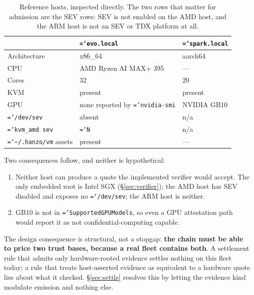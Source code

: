 \documentclass[11pt,a4paper]{article}
\newcommand{\code}[1]{\texttt{\hyphenchar\font=`\-\relax #1}}
\begin{document}
\begin{table}[h]
\centering
\begin{tabular}{@{}lll@{}}
\toprule
 & \code{evo.local} & \code{spark.local} \\
\midrule
Architecture        & x86\_64                        & aarch64 \\
CPU                 & AMD Ryzen AI MAX+ 395          & --- \\
Cores               & 32                             & 20 \\
KVM                 & present                        & present \\
GPU                 & none reported by \code{nvidia-smi} & NVIDIA GB10 \\
\code{/dev/sev}     & absent                         & n/a \\
\code{kvm\_amd sev} & \code{N}                       & n/a \\
\code{\~{}/.hanzo/vm} assets & present               & --- \\
\bottomrule
\end{tabular}
\caption{Reference hosts, inspected directly. The two rows that matter for
admission are the SEV rows: SEV is not enabled on the AMD host, and the ARM
host is not an SEV or TDX platform at all.}
\end{table}

Two consequences follow, and neither is hypothetical:

\begin{enumerate}
  \item Neither host can produce a quote the implemented verifier would accept.
    The only embedded root is Intel SGX (§\ref{sec:verifier}); the AMD host has
    SEV disabled and exposes no \code{/dev/sev}; the ARM host is neither.
  \item GB10 is not in \code{SupportedGPUModels}, so even a GPU attestation
    path would report it as not confidential-computing capable.
\end{enumerate}

The design consequence is structural, not a stopgap: \textbf{the chain must be
able to price two trust bases, because a real fleet contains both}. A settlement
rule that admits only hardware-rooted evidence settles nothing on this fleet
today; a rule that treats host-asserted evidence as equivalent to a hardware
quote lies about what it checked. §\ref{sec:settle} resolves this by letting the
evidence kind modulate emission and nothing else.
\end{document}
